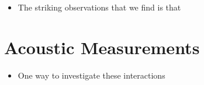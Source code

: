 \documentclass[12pt, letterpaper]{article}
\begin{document}
\begin{itemize}
	\item The striking observations that we find is that 
\end{itemize}
\section{Acoustic Measurements} \label{sec:Acoustics}

\begin{itemize}
	\item One way to investigate these interactions 
\end{itemize}













\printbibliography[heading=bibintoc]
\end{document}
